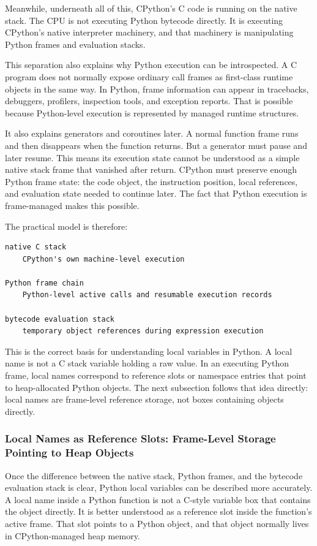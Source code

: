 Meanwhile, underneath all of this, CPython's C code is running on the native stack. The CPU is not executing Python bytecode directly. It is executing CPython's native interpreter machinery, and that machinery is manipulating Python frames and evaluation stacks.

This separation also explains why Python execution can be introspected. A C program does not normally expose ordinary call frames as first-class runtime objects in the same way. In Python, frame information can appear in tracebacks, debuggers, profilers, inspection tools, and exception reports. That is possible because Python-level execution is represented by managed runtime structures.

It also explains generators and coroutines later. A normal function frame runs and then disappears when the function returns. But a generator must pause and later resume. This means its execution state cannot be understood as a simple native stack frame that vanished after return. CPython must preserve enough Python frame state: the code object, the instruction position, local references, and evaluation state needed to continue later. The fact that Python execution is frame-managed makes this possible.

The practical model is therefore:

\begin{verbatim}
native C stack
    CPython's own machine-level execution

Python frame chain
    Python-level active calls and resumable execution records

bytecode evaluation stack
    temporary object references during expression execution
\end{verbatim}

This is the correct basis for understanding local variables in Python. A local name is not a C stack variable holding a raw value. In an executing Python frame, local names correspond to reference slots or namespace entries that point to heap-allocated Python objects. The next subsection follows that idea directly: local names are frame-level reference storage, not boxes containing objects directly.


\subsubsection{Local Names as Reference Slots: Frame-Level Storage Pointing to Heap Objects}

Once the difference between the native stack, Python frames, and the bytecode evaluation stack is clear, Python local variables can be described more accurately. A local name inside a Python function is not a C-style variable box that contains the object directly. It is better understood as a reference slot inside the function's active frame. That slot points to a Python object, and that object normally lives in CPython-managed heap memory.

